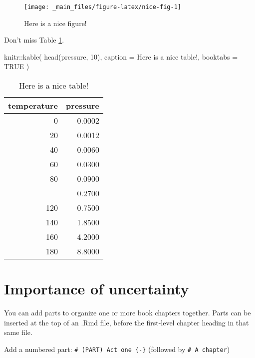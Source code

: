 \documentclass[
]{book}
\newenvironment{Shaded}{\begin{snugshade}}{\end{snugshade}}
\newcommand{\AttributeTok}[1]{\textcolor[rgb]{0.77,0.63,0.00}{#1}}
\newcommand{\ConstantTok}[1]{\textcolor[rgb]{0.00,0.00,0.00}{#1}}
\newcommand{\DecValTok}[1]{\textcolor[rgb]{0.00,0.00,0.81}{#1}}
\newcommand{\FunctionTok}[1]{\textcolor[rgb]{0.00,0.00,0.00}{#1}}
\newcommand{\NormalTok}[1]{#1}
\newcommand{\SpecialCharTok}[1]{\textcolor[rgb]{0.00,0.00,0.00}{#1}}
\newcommand{\StringTok}[1]{\textcolor[rgb]{0.31,0.60,0.02}{#1}}
\begin{document}
\begin{figure}

{\centering \texttt{[image: \_main\_files/figure-latex/nice-fig-1]} 

}

\caption{Here is a nice figure!}\label{fig:nice-fig}
\end{figure}

Don't miss Table \ref{tab:nice-tab}.

\begin{Shaded}
\begin{Highlighting}[]
\NormalTok{knitr}\SpecialCharTok{::}\FunctionTok{kable}\NormalTok{(}
  \FunctionTok{head}\NormalTok{(pressure, }\DecValTok{10}\NormalTok{), }\AttributeTok{caption =} \StringTok{\textquotesingle{}Here is a nice table!\textquotesingle{}}\NormalTok{,}
  \AttributeTok{booktabs =} \ConstantTok{TRUE}
\NormalTok{)}
\end{Highlighting}
\end{Shaded}

\begin{table}

\caption{\label{tab:nice-tab}Here is a nice table!}
\centering
\begin{tabular}[t]{rr}
\toprule
temperature & pressure\\
\midrule
0 & 0.0002\\
20 & 0.0012\\
40 & 0.0060\\
60 & 0.0300\\
80 & 0.0900\\
\addlinespace
100 & 0.2700\\
120 & 0.7500\\
140 & 1.8500\\
160 & 4.2000\\
180 & 8.8000\\
\bottomrule
\end{tabular}
\end{table}

\hypertarget{importance}{%
\chapter{Importance of uncertainty}\label{importance}}

You can add parts to organize one or more book chapters together. Parts can be inserted at the top of an .Rmd file, before the first-level chapter heading in that same file.

Add a numbered part: \texttt{\#\ (PART)\ Act\ one\ \{-\}} (followed by \texttt{\#\ A\ chapter})
\end{document}
